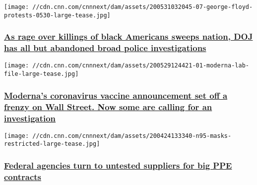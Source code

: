 \href{/2020/06/01/politics/george-floyd-police-doj-investigations-invs/index.html}{}

\texttt{[image: //cdn.cnn.com/cnnnext/dam/assets/200531032045-07-george-floyd-protests-0530-large-tease.jpg]}

\hypertarget{as-rage-over-killings-of-black-americans-sweeps-nation-doj-has-all-but-abandoned-broad-police-investigations}{%
\subsubsection{\texorpdfstring{\href{/2020/06/01/politics/george-floyd-police-doj-investigations-invs/index.html}{As
rage over killings of black Americans sweeps nation, DOJ has all but
abandoned broad police
investigations}}{As rage over killings of black Americans sweeps nation, DOJ has all but abandoned broad police investigations}}\label{as-rage-over-killings-of-black-americans-sweeps-nation-doj-has-all-but-abandoned-broad-police-investigations}}

\href{/2020/06/01/business/moderna-vaccine-stock-sales-invs/index.html}{}

\texttt{[image: //cdn.cnn.com/cnnnext/dam/assets/200529124421-01-moderna-lab-file-large-tease.jpg]}

\hypertarget{modernas-coronavirus-vaccine-announcement-set-off-a-frenzy-on-wall-street-now-some-are-calling-for-an-investigation}{%
\subsubsection{\texorpdfstring{\href{/2020/06/01/business/moderna-vaccine-stock-sales-invs/index.html}{Moderna's
coronavirus vaccine announcement set off a frenzy on Wall Street. Now
some are calling for an
investigation}}{Moderna's coronavirus vaccine announcement set off a frenzy on Wall Street. Now some are calling for an investigation}}\label{modernas-coronavirus-vaccine-announcement-set-off-a-frenzy-on-wall-street-now-some-are-calling-for-an-investigation}}

\href{/2020/05/27/politics/coronavirus-federal-contracts-ppe-suppliers-problems-invs/index.html}{}

\texttt{[image: //cdn.cnn.com/cnnnext/dam/assets/200424133340-n95-masks-restricted-large-tease.jpg]}

\hypertarget{federal-agencies-turn-to-untested-suppliers-for-big-ppe-contracts}{%
\subsubsection{\texorpdfstring{\href{/2020/05/27/politics/coronavirus-federal-contracts-ppe-suppliers-problems-invs/index.html}{Federal
agencies turn to untested suppliers for big PPE
contracts}}{Federal agencies turn to untested suppliers for big PPE contracts}}\label{federal-agencies-turn-to-untested-suppliers-for-big-ppe-contracts}}

